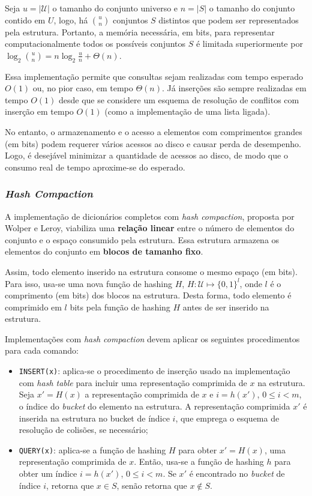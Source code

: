 \documentclass[12pt,twoside,english,brazilian]{article}
\begin{document}
Seja $u = |\mathcal{U}|$ o tamanho do conjunto universo e $n=|S|$ o tamanho do conjunto contido em $U$, logo, há $\binom{u}{n}$ conjuntos $S$ distintos que podem ser representados pela estrutura. Portanto, a memória necessária, em bits, para representar computacionalmente todos os possíveis conjuntos $S$ é limitada superiormente por $\log_2 \binom{u}{n} = n \log_2 \frac{u}{n} + \Theta(n)$.

Essa implementação permite que consultas sejam realizadas com tempo esperado $O(1)$ ou, no pior caso, em tempo $\Theta(n)$. Já inserções são sempre realizadas em tempo $O(1)$ desde que se considere um esquema de resolução de conflitos com inserção em tempo $O(1)$ (como a implementação de uma lista ligada).

No entanto, o armazenamento e o acesso a elementos com comprimentos grandes (em bits) podem requerer vários acessos ao disco e causar perda de desempenho. Logo, é desejável minimizar a quantidade de acessos ao disco, de modo que o consumo real de tempo aproxime-se do esperado.

\subsubsection{\textit{Hash Compaction}}

A implementação de dicionários completos com \textit{hash compaction}, proposta por Wolper e Leroy, viabiliza uma \textbf{relação linear} entre o número de elementos do conjunto e o espaço consumido pela estrutura. Essa estrutura armazena os elementos do conjunto em \textbf{blocos de tamanho fixo}.

Assim, todo elemento inserido na estrutura consome o mesmo espaço (em bits). Para isso, usa-se uma nova função de hashing $H$, $H: \mathcal{U} \mapsto \{0, 1\}^l$, onde $l$ é o comprimento (em bits) dos blocos na estrutura. Desta forma, todo elemento é comprimido em $l$ bits pela função de hashing $H$ antes de ser inserido na estrutura.

Implementações com \textit{hash compaction} devem aplicar os seguintes procedimentos para cada comando:

\begin{itemize}
    \item \texttt{INSERT(x)}: aplica-se o procedimento de inserção usado na implementação com \textit{hash table} para incluir uma representação comprimida de $x$ na estrutura. Seja $x' = H(x)$ a representação comprimida de $x$ e $i = h(x')$, $0 \leq i < m$, o índice do \textit{bucket} do elemento na estrutura. A representação comprimida $x'$ é inserida na estrutura no bucket de índice $i$, que emprega o esquema de resolução de colisões, se necessário;
    \item \texttt{QUERY(x)}: aplica-se a função de hashing $H$ para obter $x' = H(x)$, uma representação comprimida de $x$. Então, usa-se a função de hashing $h$ para obter um índice $i = h(x')$, $0 \leq i < m$. Se $x'$ é encontrado no \textit{bucket} de índice $i$, retorna que $x \in S$, senão retorna que $x \notin S$.
\end{itemize}
\end{document}
